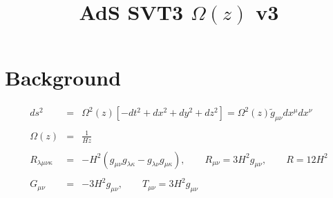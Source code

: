 \documentclass[10pt,letterpaper]{article}
\title{AdS SVT3 $\Omega(z)$ v3}
\date{}
\numberwithin{equation}{section}
\begin{document}
 
\maketitle
\noindent 
\section{Background}
\begin{eqnarray}
ds^2 &=& \Omega^2(z)\left[ -dt^2 + dx^2+dy^2+dz^2\right]= \Omega^2(z)\tilde g_{\mu\nu}dx^\mu dx^\nu
\\ \nonumber\\
\Omega(z) &=& \frac{1}{Hz}
\\ \nonumber\\
R_{\lambda\mu\nu\kappa} &=& -H^2(g_{\mu\nu}g_{\lambda\kappa} -g_{\lambda\nu}g_{\mu\kappa}),
\qquad R_{\mu\nu} =3H^2 g_{\mu\nu},\qquad R = 12H^2
\\ \nonumber\\
G_{\mu\nu} &=& -3H^2 g_{\mu\nu},\qquad T_{\mu\nu} = 3H^2 g_{\mu\nu}
\end{eqnarray}
%
%
%
\end{document}
